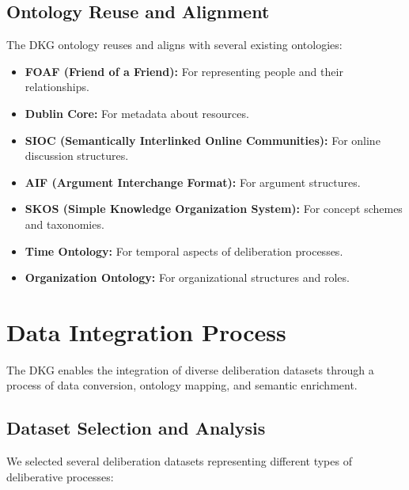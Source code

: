 \documentclass[runningheads]{llncs}  %
\begin{document}
\subsection{Ontology Reuse and Alignment}
The DKG ontology reuses and aligns with several existing ontologies:

\begin{itemize}
    \item \textbf{FOAF (Friend of a Friend):} For representing people and their relationships.
    \item \textbf{Dublin Core:} For metadata about resources.
    \item \textbf{SIOC (Semantically Interlinked Online Communities):} For online discussion structures.
    \item \textbf{AIF (Argument Interchange Format):} For argument structures.
    \item \textbf{SKOS (Simple Knowledge Organization System):} For concept schemes and taxonomies.
    \item \textbf{Time Ontology:} For temporal aspects of deliberation processes.
    \item \textbf{Organization Ontology:} For organizational structures and roles.
\end{itemize}

\section{Data Integration Process}
The DKG enables the integration of diverse deliberation datasets through a process of data conversion, ontology mapping, and semantic enrichment.

\subsection{Dataset Selection and Analysis}
We selected several deliberation datasets representing different types of deliberative processes:
\end{document}
